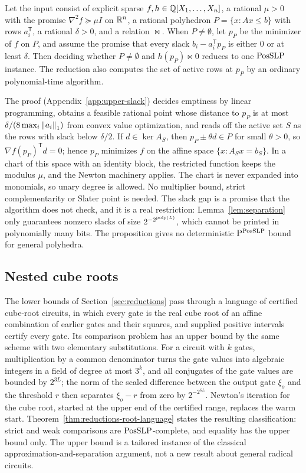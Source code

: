 \begin{proposition}
\label{prop:upper-slack-gap}
Let the input consist of explicit sparse $f,h\in\mathbb Q[X_1,\ldots,X_n]$, a
rational $\mu>0$ with the promise $\nabla^2f\succeq\mu I$ on $\mathbb R^n$, a
rational polyhedron $P=\{x:Ax\le b\}$ with rows $a_i^{\mathsf T}$, a rational
$\delta>0$, and a relation ${\bowtie}$. When $P\ne\emptyset$, let $p_P$ be
the minimizer of $f$ on $P$, and assume the promise that every slack
$b_i-a_i^{\mathsf T}p_P$ is either $0$ or at least $\delta$. Then deciding
whether $P\ne\emptyset$ and $h(p_P)\bowtie0$ reduces to one $\mathrm{PosSLP}$
instance. The reduction also computes the set of active rows at $p_P$ by an
ordinary polynomial-time algorithm.
\end{proposition}

The proof (Appendix~\ref{app:upper-slack}) decides emptiness by linear
programming, obtains a feasible rational point whose distance to $p_P$ is at
most $\delta/(8\max_i\left\lVert a_i\right\rVert_1)$ from convex value optimization, and
reads off the active set $S$ as the rows with slack below $\delta/2$. If
$d\in\ker A_S$, then $p_P\pm\theta d\in P$ for small $\theta>0$, so
$\nabla f(p_P)^{\mathsf T}d=0$; hence $p_P$ minimizes $f$ on the affine space
$\{x:A_Sx=b_S\}$. In a chart of this space with an identity block, the
restricted function keeps the modulus $\mu$, and the Newton machinery
applies. The chart is never expanded into monomials, so unary degree is
allowed. No multiplier bound, strict complementarity or Slater point is
needed. The slack gap is a promise that the algorithm does not check, and
it is a real restriction: Lemma~\ref{lem:separation} only guarantees nonzero
slacks of size $2^{-2^{\operatorname{poly}(L)}}$, which cannot be printed in polynomially
many bits. The proposition gives no deterministic $\mathrm P^{\mathrm{PosSLP}}$
bound for general polyhedra.

\subsection{Nested cube roots}
\label{sec:upper-roots}

The lower bounds of Section~\ref{sec:reductions} pass through a language of
certified cube-root circuits, in which every gate is the real cube root of an
affine combination of earlier gates and their squares, and supplied positive
intervals certify every gate. Its comparison problem has an upper bound by
the same scheme with two elementary substitutions. For a circuit with $k$
gates, multiplication by a common denominator turns the gate values into
algebraic integers in a field of degree at most $3^k$, and all conjugates of
the gate values are bounded by $2^{3L}$; the norm of the scaled difference
between the output gate $\xi_o$ and the threshold $r$ then separates
$\xi_o-r$ from zero by $2^{-2^{6L}}$. Newton's iteration for the cube root,
started at the upper end of the certified range, replaces the warm start. Theorem~\ref{thm:reductions-root-language} states the resulting
classification: strict and weak comparisons are $\mathrm{PosSLP}$-complete, and
equality has the upper bound only. The upper bound is a tailored instance of
the classical approximation-and-separation argument, not a new result about
general radical circuits.

